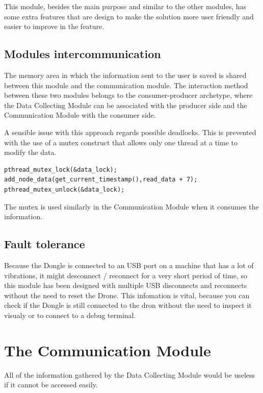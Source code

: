 This module, besides the main purpose and similar to the other modules, has some extra features that are design to make the solution more user friendly and easier to improve in the feature.

\subsection{Modules intercommunication}

The memory area in which the information sent to the user is saved is shared between this module and the communication module. The interaction method between these two modules belongs to the consumer-producer archetype, where the Data Collecting Module can be associated with the producer side and the Communication Module with the consumer side.

A sensible issue with this approach regards possible deadlocks. This is prevented with the use of a mutex construct that allows only one thread at a time to modify the data.

\lstset{numbers=none, mathescape=true, nolol=false,caption=Data Collection use of mutex,label=lst:task}
\begin{lstlisting}
pthread_mutex_lock(&data_lock);
add_node_data(get_current_timestamp(),read_data + 7);
pthread_mutex_unlock(&data_lock);
\end{lstlisting}

The mutex is used similarly in the Communication Module when it consumes the information.


\subsection{Fault tolerance}

Because the Dongle is connected to an USB port on a machine that has a lot of vibrations, it might desconnect / reconnect for a very short period of time, so this module has been designed  with multiple USB disconnects and reconnects without the need to reset the Drone. This infomation is vital, because you can check if the Dongle is still connected to the dron without the need to inspect it visualy or to connect to a debug terminal.

\section{The Communication Module}

All of the information gathered by the Data Collecting Module would be useless if it cannot be accessed easily.

